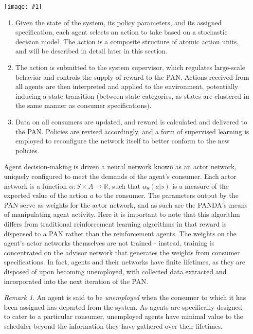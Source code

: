 \documentclass{article}
\theoremstyle{definition}
\theoremstyle{remark}
\newtheorem*{remark}{Remark}
\newcommand{\func}[3]{#1:#2\rightarrow#3}
\newcommand{\addpic}[1]{\texttt{[image: \#1]}}
\begin{document}
			\addpic{figures/actor_network}

			\begin{enumerate}

				\item Given the state of the system, its policy parameters, and its assigned specification, each agent selects an action to take based on a stochastic decision model. The action is a composite structure of atomic action units, and will be described in detail later in this section.

				\item The action is submitted to the system supervisor, which regulates large-scale behavior and controls the supply of reward to the PAN. Actions received from all agents are then interpreted and applied to the environment, potentially inducing a state transition (between state categories, as states are clustered in the same manner as consumer specifications).

				\item Data on all consumers are updated, and reward is calculated and delivered to the PAN. Policies are revised accordingly, and a form of supervised learning is employed to reconfigure the network itself to better conform to the new policies.

			\end{enumerate}

			Agent decision-making is driven a neural network known as an actor network, uniquely configured to meet the demands of the agent's consumer. Each actor network is a function $\func{\alpha}{S \times A}{\mathbb{R}}$, such that $\alpha_\theta(a | s)$ is a measure of the expected value of the action $a$ to the consumer. The parameters output by the PAN serve as weights for the actor network, and as such are the PANDA's means of manipulating agent activity. Here it is important to note that this algorithm differs from traditional reinforcement learning algorithms in that reward is dispensed to a PAN rather than the reinforcement agents. The weights on the agent's actor networks themselves are not trained - instead, training is concentrated on the advisor network that generates the weights from consumer specifications. In fact, agents and their networks have finite lifetimes, as they are disposed of upon becoming unemployed, with collected data extracted and incorporated into the next iteration of the PAN.

			\begin{remark}
				An agent is said to be \emph{unemployed} when the consumer to which it has been assigned has departed from the system. As agents are specifically designed to cater to a particular consumer, unemployed agents have minimal value to the scheduler beyond the information they have gathered over their lifetimes.
			\end{remark}
\end{document}
